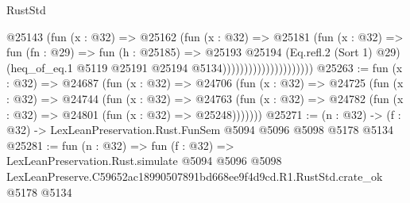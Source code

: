 \begin{lexlean}{RustStd}
\begin{coremodule}
                                    @25143
                                      (fun (x : @32) =>
                                      @25162
                                        (fun (x : @32) =>
                                        @25181
                                          (fun (x : @32) =>
                                          fun (fn : @29) =>
                                          fun (h : @25185) =>
                                          @25193
                                            @25194
                                            (Eq.refl.{2} (Sort 1) @29)
                                            (heq_of_eq.{1}
                                              @5119
                                              @25191
                                              @25194
                                              @5134)))))))))))))))))))))
@25263 := fun (x : @32) =>
  @24687
    (fun (x : @32) =>
    @24706
      (fun (x : @32) =>
      @24725
        (fun (x : @32) =>
        @24744
          (fun (x : @32) =>
          @24763 (fun (x : @32) => @24782 (fun (x : @32) => @24801 (fun (x : @32) => @25248)))))))
@25271 := (n : @32) -> (f : @32) -> LexLeanPreservation.Rust.FunSem @5094 @5096 @5098 @5178 @5134
@25281 := fun (n : @32) =>
  fun (f : @32) =>
  LexLeanPreservation.Rust.simulate
    @5094
    @5096
    @5098
    LexLeanPreserve.C59652ac18990507891bd668ee9f4d9cd.R1.RustStd.crate_ok
    @5178
    @5134
\end{coremodule}
\end{lexlean}
